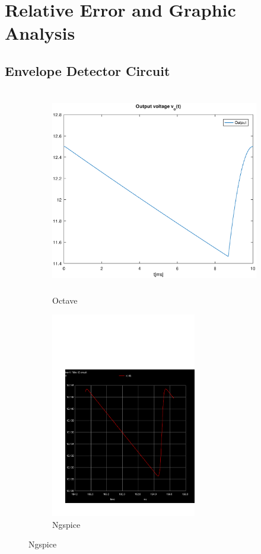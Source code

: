 \section{Relative Error and Graphic Analysis}
\label{sec:erroranalysis}


\subsection{Envelope Detector Circuit}
\label{subsec:first_topic_error}

\begin{figure}[H]

\begin{subfigure}{0.5\textwidth}
\includegraphics[width=1.1\linewidth, height=9cm]{envelope.eps} 
\caption{Octave}
\label{fig:theofirstcompare}
\end{subfigure}
\begin{subfigure}{0.5\textwidth}
\includegraphics[trim= 0cm 0cm 0cm 10cm, clip, width=1.1\linewidth, height=9cm]{trans1aux.pdf}
\caption{Ngspice}
\label{fig:simfirstcompare}
\end{subfigure}

\label{fig:compar1}
\end{figure}

